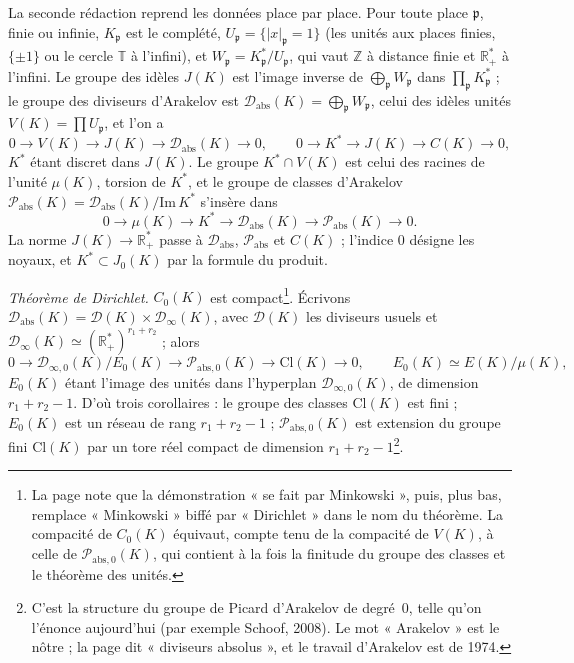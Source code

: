 \documentclass[11pt,a4paper]{article}
\begin{document}
La seconde rédaction reprend les données place par place. Pour toute place
$\mathfrak{p}$, finie ou infinie, $K_{\mathfrak{p}}$ est le complété,
$U_{\mathfrak{p}} = \{|x|_{\mathfrak{p}} = 1\}$ (les unités aux places finies,
$\{\pm 1\}$ ou le cercle $\mathbb{T}$ à l'infini), et $W_{\mathfrak{p}} =
K^{*}_{\mathfrak{p}}/U_{\mathfrak{p}}$, qui vaut $\mathbb{Z}$ à distance finie et
$\mathbb{R}^{*}_{+}$ à l'infini. Le groupe des idèles $J(K)$ est l'image inverse
de $\bigoplus_{\mathfrak{p}} W_{\mathfrak{p}}$ dans $\prod_{\mathfrak{p}}
K^{*}_{\mathfrak{p}}$ ; le groupe des diviseurs d'Arakelov est
$\mathcal{D}_{\mathrm{abs}}(K) = \bigoplus_{\mathfrak{p}} W_{\mathfrak{p}}$, celui
des idèles unités $V(K) = \prod U_{\mathfrak{p}}$, et l'on a
\[
0 \to V(K) \to J(K) \to \mathcal{D}_{\mathrm{abs}}(K) \to 0,
\qquad
0 \to K^{*} \to J(K) \to C(K) \to 0,
\]
$K^{*}$ étant discret dans $J(K)$. Le groupe $K^{*} \cap V(K)$ est celui des
racines de l'unité $\mu(K)$, torsion de $K^{*}$, et le groupe de classes
d'Arakelov $\mathcal{P}_{\mathrm{abs}}(K) = \mathcal{D}_{\mathrm{abs}}(K)/\mathrm{Im}\,K^{*}$
s'insère dans
\[
0 \to \mu(K) \to K^{*} \to \mathcal{D}_{\mathrm{abs}}(K) \to \mathcal{P}_{\mathrm{abs}}(K) \to 0.
\]
La norme $J(K) \to \mathbb{R}^{*}_{+}$ passe à $\mathcal{D}_{\mathrm{abs}}$,
$\mathcal{P}_{\mathrm{abs}}$ et $C(K)$ ; l'indice $0$ désigne les noyaux, et
$K^{*} \subset J_0(K)$ par la formule du produit.

\emph{Théorème de Dirichlet.} $C_0(K)$ est compact\footnote{La page note que la
démonstration « se fait par Minkowski », puis, plus bas, remplace « Minkowski »
biffé par « Dirichlet » dans le nom du théorème. La compacité de $C_0(K)$
équivaut, compte tenu de la compacité de $V(K)$, à celle de
$\mathcal{P}_{\mathrm{abs},0}(K)$, qui contient à la fois la finitude du groupe
des classes et le théorème des unités.}. Écrivons
$\mathcal{D}_{\mathrm{abs}}(K) = \mathcal{D}(K) \times \mathcal{D}_\infty(K)$,
avec $\mathcal{D}(K)$ les diviseurs usuels et $\mathcal{D}_\infty(K) \simeq
(\mathbb{R}^{*}_{+})^{r_1 + r_2}$ ; alors
\[
0 \to \mathcal{D}_{\infty,0}(K)/E_0(K) \to \mathcal{P}_{\mathrm{abs},0}(K) \to \mathrm{Cl}(K) \to 0,
\qquad E_0(K) \simeq E(K)/\mu(K),
\]
$E_0(K)$ étant l'image des unités dans l'hyperplan $\mathcal{D}_{\infty,0}(K)$,
de dimension $r_1 + r_2 - 1$. D'où trois corollaires : le groupe des classes
$\mathrm{Cl}(K)$ est fini ; $E_0(K)$ est un réseau de rang $r_1 + r_2 - 1$ ;
$\mathcal{P}_{\mathrm{abs},0}(K)$ est extension du groupe fini $\mathrm{Cl}(K)$
par un tore réel compact de dimension $r_1 + r_2 - 1$\footnote{C'est la
structure du groupe de Picard d'Arakelov de degré~$0$, telle qu'on l'énonce
aujourd'hui (par exemple Schoof, 2008). Le mot « Arakelov » est le nôtre ; la
page dit « diviseurs absolus », et le travail d'Arakelov est de 1974.}.
\end{document}
